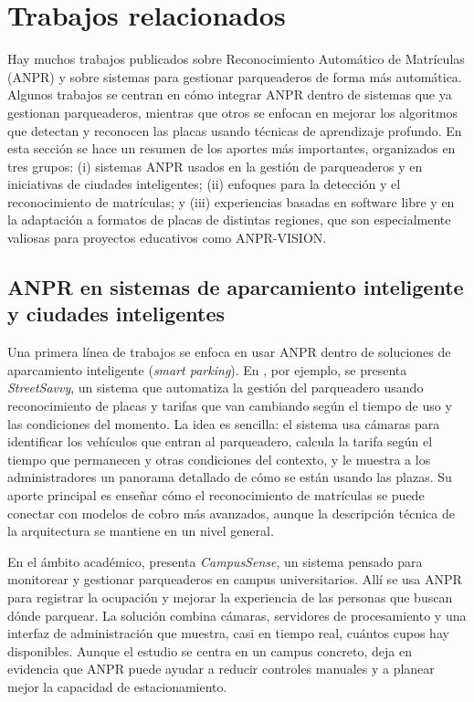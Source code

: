 \section{Trabajos relacionados}
\label{sec:relacionados}

Hay muchos trabajos publicados sobre Reconocimiento Automático de Matrículas (ANPR) y sobre sistemas para gestionar parqueaderos de forma más automática. Algunos trabajos se centran en cómo integrar ANPR dentro de sistemas que ya gestionan parqueaderos, mientras que otros se enfocan en mejorar los algoritmos que detectan y reconocen las placas usando técnicas de aprendizaje profundo.
En esta sección se hace un resumen de los aportes más importantes, organizados en tres grupos: (i) sistemas ANPR usados en la gestión de parqueaderos y en iniciativas de ciudades inteligentes; (ii) enfoques para la detección y el reconocimiento de matrículas; y (iii) experiencias basadas en software libre y en la adaptación a formatos de placas de distintas regiones, que son especialmente valiosas para proyectos educativos como ANPR-VISION.

\subsection{ANPR en sistemas de aparcamiento inteligente y ciudades inteligentes}

Una primera línea de trabajos se enfoca en usar ANPR dentro de soluciones de aparcamiento inteligente (\textit{smart parking}). En \cite{streetsavvy_2024}, por ejemplo, se presenta \textit{StreetSavvy}, un sistema que automatiza la gestión del parqueadero usando reconocimiento de placas y tarifas que van cambiando según el tiempo de uso y las condiciones del momento. La idea es sencilla: el sistema usa cámaras para identificar los vehículos que entran al parqueadero, calcula la tarifa según el tiempo que permanecen y otras condiciones del contexto, y le muestra a los administradores un panorama detallado de cómo se están usando las plazas. Su aporte principal es enseñar cómo el reconocimiento de matrículas se puede conectar con modelos de cobro más avanzados, aunque la descripción técnica de la arquitectura se mantiene en un nivel general.

En el ámbito académico, \cite{campussense_2017} presenta \textit{CampusSense}, un sistema pensado para monitorear y gestionar parqueaderos en campus universitarios. Allí se usa ANPR para registrar la ocupación y mejorar la experiencia de las personas que buscan dónde parquear. La solución combina cámaras, servidores de procesamiento y una interfaz de administración que muestra, casi en tiempo real, cuántos cupos hay disponibles. Aunque el estudio se centra en un campus concreto, deja en evidencia que ANPR puede ayudar a reducir controles manuales y a planear mejor la capacidad de estacionamiento.

